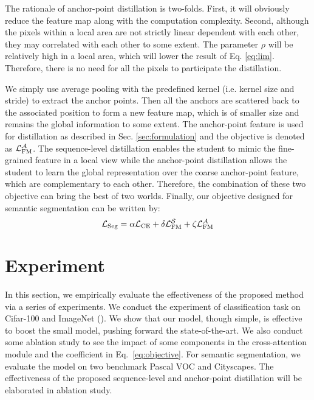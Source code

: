 \documentclass[10pt,twocolumn,letterpaper]{article}
\begin{document}
The rationale of anchor-point distillation is two-folds. First, it will obviously reduce the feature map along with the computation complexity. Second, although the pixels within a local area are not strictly linear dependent with each other, they may correlated with each other to some extent. The parameter $\rho$ will be relatively high in a local area, which will lower the result of Eq. \ref{eq:lim}. Therefore, there is no need for all the pixels to participate the distillation. 

We simply use average pooling with the predefined kernel (i.e. kernel size and stride) to extract the anchor points. Then all the anchors are scattered back to the associated position to form a new feature map, which is of smaller size and remains the global information to some extent. The anchor-point feature is used for distillation as described in Sec. \ref{sec:formulation} and the objective is denoted as $\mathcal{L}_{\rm{FM}}^\mathcal{A}$. The sequence-level distillation enables the student to mimic the fine-grained feature in a local view while the anchor-point distillation allows the student to learn the global representation over the coarse anchor-point feature, which are complementary to each other. Therefore, the combination of these two objective can bring the best of two worlds. Finally, our objective designed for semantic segmentation can be written by:
\begin{equation}
    \mathcal{L}_{\rm{Seg}}=\alpha\mathcal{L}_{\rm{CE}}+
    \delta\mathcal{L}_{\rm{FM}}^\mathcal{S}+
    \zeta\mathcal{L}_{\rm{FM}}^\mathcal{A}
\end{equation}


\section{Experiment}
\label{sec:experiment}
In this section, we empirically evaluate the effectiveness of the proposed method via a series of experiments. We conduct the experiment of classification task on Cifar-100 and ImageNet (\cite{deng2009imagenet}). We show that our model, though simple, is effective to boost the small model, pushing forward the state-of-the-art. We also conduct some ablation study to see the impact of some components in the cross-attention module and the coefficient in Eq.~\ref{eq:objective}. For semantic segmentation, we evaluate the model on two benchmark Pascal VOC and Cityscapes. The effectiveness of the proposed sequence-level and anchor-point distillation will be elaborated in ablation study.
\end{document}
